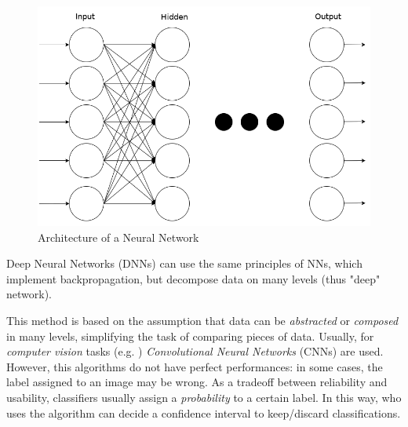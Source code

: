\begin{figure}[htpb]
\centering
    \includegraphics[scale=0.28]{../img/nn}
    \caption{Architecture of a Neural Network}
    \label{fig:nn}
\end{figure}

Deep Neural Networks (DNNs) can use the same principles of NNs, which implement 
backpropagation, but decompose data on many levels (thus "deep" network).

This method is based on the assumption that data can be \textit{abstracted} or 
\textit{composed} in many levels, simplifying the task of comparing pieces of 
data.
Usually, for \textit{computer vision} tasks (e.g. \cite{Handwritten}) 
\textit{Convolutional Neural Networks} (CNNs) are used\cite{CNN}.
However, this algorithms do not have perfect performances: in some cases, the 
label assigned to an image may be wrong. As a tradeoff between reliability and 
usability, classifiers usually assign a \textit{probability} to a certain label. 
In this way, who uses the algorithm can decide a confidence interval to 
keep/discard classifications. 